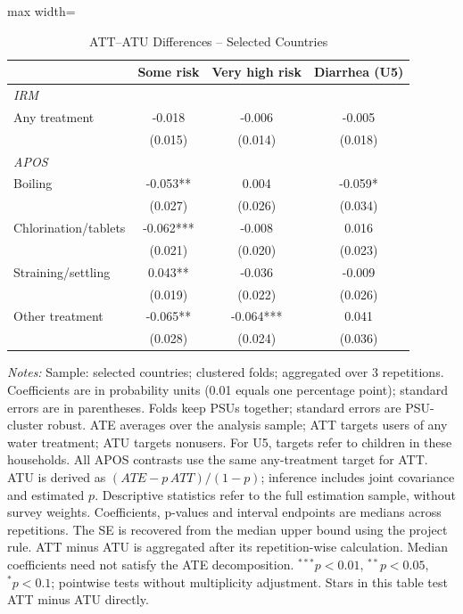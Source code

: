 \begin{table}[htbp]
\centering
\caption{ATT--ATU Differences -- Selected Countries}
\label{tab:ate-att-atu-selected-countries-clustered-aggregated-difference}
\scriptsize
\setlength{\tabcolsep}{4pt}
\renewcommand{\arraystretch}{0.92}
\begin{adjustbox}{max width=\linewidth}
\begin{tabular}{lccc}
\hline\hline
 & Some risk & Very high risk & Diarrhea (U5) \\
\midrule
\multicolumn{4}{l}{\textit{IRM}} \\
Any treatment & -0.018 & -0.006 & -0.005 \\
 & (0.015) & (0.014) & (0.018) \\
\midrule
\multicolumn{4}{l}{\textit{APOS}} \\
Boiling & -0.053** & 0.004 & -0.059* \\
 & (0.027) & (0.026) & (0.034) \\
Chlorination/tablets & -0.062*** & -0.008 & 0.016 \\
 & (0.021) & (0.020) & (0.023) \\
Straining/settling & 0.043** & -0.036 & -0.009 \\
 & (0.019) & (0.022) & (0.026) \\
Other treatment & -0.065** & -0.064*** & 0.041 \\
 & (0.028) & (0.024) & (0.036) \\
\hline\hline
\end{tabular}
\end{adjustbox}
\par\vspace{3pt}
\begin{minipage}{\linewidth}\scriptsize \textit{Notes:} Sample: selected countries; clustered folds; aggregated over 3 repetitions. Coefficients are in probability units (0.01 equals one percentage point); standard errors are in parentheses. Folds keep PSUs together; standard errors are PSU-cluster robust. ATE averages over the analysis sample; ATT targets users of any water treatment; ATU targets nonusers. For U5, targets refer to children in these households. All APOS contrasts use the same any-treatment target for ATT. ATU is derived as $(ATE-p\,ATT)/(1-p)$; inference includes joint covariance and estimated $p$. Descriptive statistics refer to the full estimation sample, without survey weights. Coefficients, p-values and interval endpoints are medians across repetitions. The SE is recovered from the median upper bound using the project rule. ATT minus ATU is aggregated after its repetition-wise calculation. Median coefficients need not satisfy the ATE decomposition. $^{***}p<0.01$, $^{**}p<0.05$, $^{*}p<0.1$; pointwise tests without multiplicity adjustment. Stars in this table test ATT minus ATU directly.\end{minipage}
\end{table}
